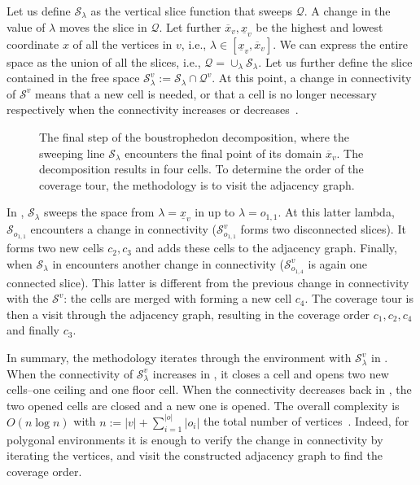 Let us define $\mathcal{S}_\lambda$ as the vertical slice function that sweeps $\mathcal{Q}$. A change in the value of $\lambda$ moves the slice in $\mathcal{Q}$. Let further $\overline{x}_v,\underline{x}_v$ be the highest and lowest coordinate $x$ of all the vertices in $v$, i.e., $\lambda\in[\underline{x}_v,\overline{x}_v]$. We can express the entire space as the union of all the slices, i.e., $\mathcal{Q}=\cup_{\lambda}\mathcal{S}_\lambda$. Let us further define the slice contained in the free space $\mathcal{S}^v_\lambda:=\mathcal{S}_\lambda\cap\mathcal{Q}^{v}$.
At this point, a change in connectivity of $\mathcal{S}^v$ means that a new cell is needed, or that a cell is no longer necessary respectively when the connectivity increases or decreases~\citep{choset2000exact}. 
\begin{figure}[h]
  \centering
  \selectfont
  
  \caption[Result of the boustrophedon decomposition]{The final step of the boustrophedon decomposition, where the sweeping line $\mathcal{S}_{\lambda}$ encounters the final point of its domain $\overline{x}_v$. The decomposition results in four cells. To determine the order of the coverage tour, the methodology is to  visit the adjacency graph.}
  \label{fig:bcd4}
\end{figure}
In , $\mathcal{S}_\lambda$ sweeps the space from $\lambda=\underline{x}_v$ in  up to $\lambda=o_{1,1}$. At this latter lambda, $\mathcal{S}_{o_{1,1}}$ encounters a change in connectivity ($\mathcal{S}^v_{o_{1,1}}$ forms two disconnected slices). It forms two new cells $c_2,c_3$ and adds these cells to the adjacency graph. Finally, when $\mathcal{S}_\lambda$ in encounters another change in connectivity ($\mathcal{S}^v_{o_{1,4}}$ is again one connected slice). This latter is different from the previous change in connectivity with the $\mathcal{S}^v$: the cells are merged with forming a new cell $c_4$. The coverage tour is then a visit through the adjacency graph, resulting in the coverage order $c_1,c_2,c_4$ and finally $c_3$. 

In summary, the methodology iterates through the environment with $\mathcal{S}^v_{\lambda}$ in . When the connectivity of $\mathcal{S}^v_{\lambda}$ increases in , it closes a cell and opens two new cells--one ceiling and one floor cell. When the connectivity decreases back in , the two opened cells are closed and a new one is opened. The overall complexity is $O(n\log{n})$ with $n:=|v|+\sum_{i=1}^{|o|}|o_i|$ the total number of vertices~\citep{choset2000exact}. Indeed, for polygonal environments it is enough to verify the change in connectivity by iterating the vertices, and visit the constructed adjacency graph to find the coverage order. 


